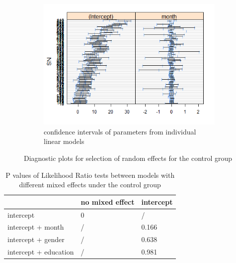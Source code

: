 \begin{figure}[H]
\begin{subfigure}{.33\textwidth}
  \centering
  \includegraphics[width=1\linewidth]{../../plots/interval_control.png}
  \caption{confidence intervals of parameters from individual linear models}
  \label{fig:6c}
\end{subfigure}
\caption{Diagnostic plots for selection of random effects for the control group}
\label{fig:diagnostic.control}
\end{figure}

\begin{table}[H]
\centering
\begin{tabular}{|l|l|l|}
\hline
& no mixed effect & intercept \\
\hline
intercept & 0 &/ \\
\hline
intercept + month &/ & 0.166 \\
\hline
intercept + gender &/ & 0.638 \\
\hline
intercept + education &/ & 0.981 \\
\hline
\end{tabular}
\caption{P values of Likelihood Ratio tests between models with different mixed effects under the control group}
\label{tab:model.comp.control.me.lrt}
\end{table}
